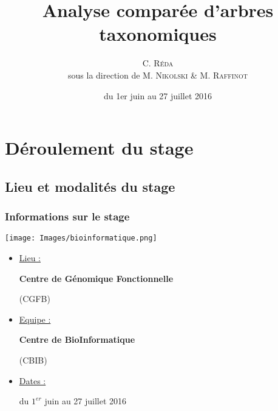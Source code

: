 \documentclass{beamer}
\title{Analyse comparée d'arbres taxonomiques}
\author{C. \textsc{Réda}\\sous la direction de M. \textsc{Nikolski} \& M. \textsc{Raffinot}}
\institute{CGFB, équipe CBIB, Bordeaux}
\date{du 1er juin au 27 juillet 2016}
\begin{document}
\maketitle
\tableofcontents
\setlength{\parindent}{1cm}


\section{Déroulement du stage}

\begin{frame}
\tableofcontents[currentsection]
\end{frame}

\subsection{Lieu et modalités du stage}

\begin{frame}
\tableofcontents[currentsubsection]
\end{frame}

\begin{frame}
\frametitle{Informations sur le stage}

\begin{center}

\texttt{[image: Images/bioinformatique.png]}

\begin{itemize}
\item \uline{Lieu :} 
\begin{flushcenter} \bf Centre de Génomique Fonctionnelle \end{flushcenter}
\bigskip
\begin{flushcenter} (CGFB) \end{flushcenter}
\item \uline{Equipe :} 
\begin{flushcenter} \bf Centre de BioInformatique \end{flushcenter}
\bigskip
\begin{flushcenter} (CBIB) \end{flushcenter}
\item \uline{Dates :} 
\begin{flushcenter} du $1^{er}$ juin au 27 juillet 2016 \end{flushcenter}
\end{itemize}

\end{center}


\end{frame}
\end{document}
